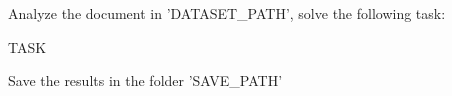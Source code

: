 
\begin{tcolorbox}[colback=cadmiumgreen!5!white,colframe=forestgreen!75!white,breakable,title=\textit{Prompt for instructing multi-agent frameworks to solve tasks.}]

\begin{VerbatimWrap}
Analyze the document in '{{DATASET_PATH}}', solve the following task: 

{{TASK}}

Save the results in the folder '{{SAVE_PATH}}' 
\end{VerbatimWrap}
\end{tcolorbox}